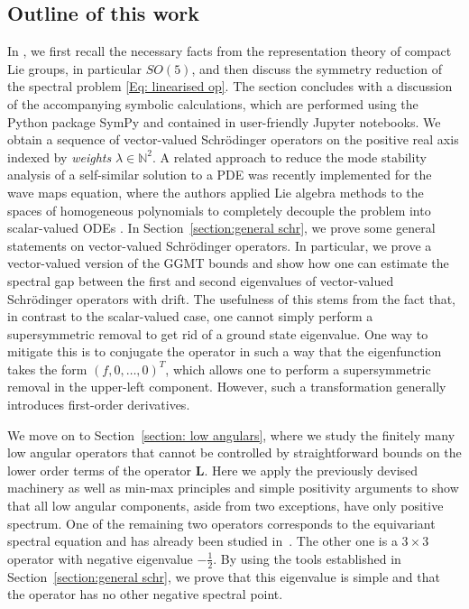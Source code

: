\documentclass[11pt,reqno]{amsart}
\theoremstyle{remark}
\theoremstyle{definition}
\begin{document}
\subsection{Outline of this work}

In , we first recall the necessary facts from the representation theory of compact Lie groups, in particular $SO(5)$, and then discuss the symmetry reduction of the spectral problem \eqref{Eq: linearised op}.
The section concludes with a discussion of the accompanying symbolic calculations, which are performed using the Python package SymPy and contained in user-friendly Jupyter notebooks. We obtain a sequence of vector-valued Schr\"odinger operators on the positive real axis indexed by \emph{weights} $\lambda \in \mathbb N^2$.
A related approach to reduce the mode stability analysis of a self-similar solution to a PDE was recently implemented for the wave maps equation, where the authors applied Lie algebra methods to the spaces of homogeneous polynomials to completely decouple the problem into scalar-valued ODEs \cite{WeiKocDon25,DonMos26}. 
In Section~\ref{section:general schr}, we prove some general statements on vector-valued Schrödinger operators. In particular, we prove a vector-valued version of the GGMT bounds and show how one can estimate the spectral gap between the first and second eigenvalues of vector-valued Schrödinger operators with drift. The usefulness of this stems from the fact that, in contrast to the scalar-valued case, one cannot simply perform a supersymmetric removal to get rid of a ground state eigenvalue. One way to mitigate this is to conjugate the operator in such a way that the eigenfunction takes the form $(f,0,\dots,0)^T$, which allows one to perform a supersymmetric removal in the upper-left component. However, such a transformation generally introduces first-order derivatives.

We move on to Section~\ref{section: low angulars}, where we study the finitely many low angular operators that cannot be controlled by straightforward bounds on the lower order terms of the operator $\mathbf L$. Here we apply the previously devised machinery as well as min-max principles and simple positivity arguments to show that all low angular components, aside from two exceptions, have only positive spectrum. One of the remaining two operators corresponds to the equivariant spectral equation and has already been studied in~\cite{GloSch20}. The other one is a $3\times 3$ operator with negative eigenvalue $-\frac12$. By using the tools established in Section~\ref{section:general schr}, we prove that this eigenvalue is simple and that the operator has no other negative spectral point. 
\end{document}
